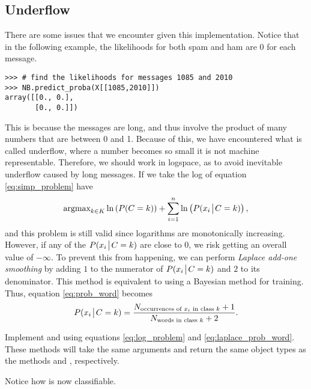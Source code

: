 \subsection*{Underflow}
There are some issues that we encounter given this implementation.
Notice that in the following example, the likelihoods for both spam and ham are 0 for each message. 
\begin{lstlisting}
>>> # find the likelihoods for messages 1085 and 2010
>>> NB.predict_proba(X[[1085,2010]])
array([[0., 0.],
       [0., 0.]])
\end{lstlisting}
This is because the messages are long, and thus involve the product of many numbers that are between 0 and 1.
Because of this, we have encountered what is called underflow, where a number becomes so small it is not machine representable.
Therefore, we should work in logspace, as to avoid inevitable underflow caused by long messages.
If we take the log of equation \ref{eq:simp_problem} have
\begin{equation}\label{eq:log_problem}
    \mbox{argmax}_{k\in K} \ln\left(P(C=k)\right) + \sum_{i=1}^{n}\ln\left(P(x_i \!\mathrel{\big|}\! C=k)\right),
\end{equation}
and this problem is still valid since logarithms are monotonically increasing.
However, if any of the $P(x_i \!\mathrel{\big|}\! C=k)$ are close to $0$, we risk getting an overall value of $-\infty$.
To prevent this from happening, we can perform \emph{Laplace add-one smoothing} by adding $1$ to the numerator of $P(x_i \!\mathrel{\big|}\! C=k)$ and $2$ to its denominator.
This method is equivalent to using a Bayesian method for training.
Thus, equation \ref{eq:prob_word} becomes
\begin{equation}\label{eq:laplace_prob_word}
    P(x_i \!\mathrel{\big|}\! C=k) = \frac{N_{\text{occurrences of $x_i$ in class $k$}} + 1}{N_{\text{words in class $k$}} + 2}.
\end{equation}

\begin{problem}\label{NB:prob_log}
Implement  and  using equations \ref{eq:log_problem} and \ref{eq:laplace_prob_word}.
These methods will take the same arguments and return the same object types as the methods  and , respectively.

\noindent Notice how   is now classifiable.
\end{problem}

